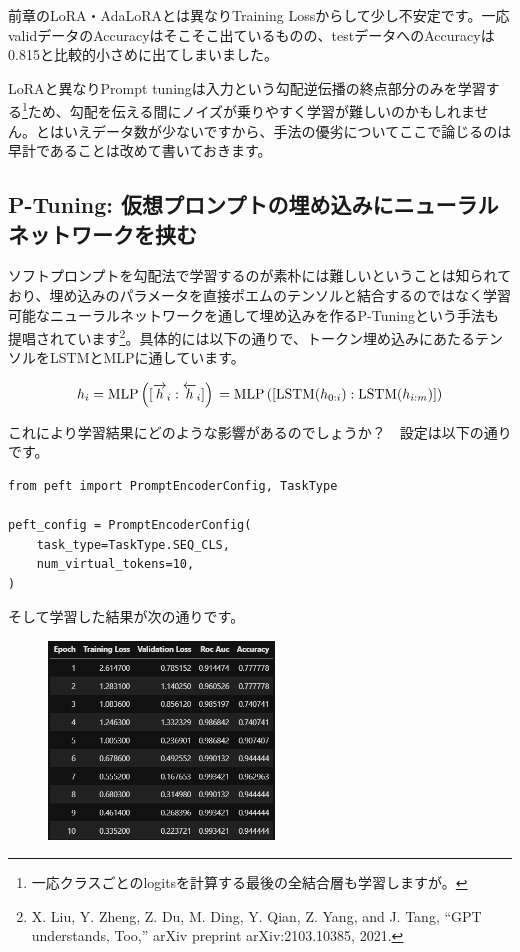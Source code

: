 \documentclass[a5paper,twoside,dvipdfmx]{jsarticle}
\begin{document}
前章のLoRA・AdaLoRAとは異なりTraining Lossからして少し不安定です。一応validデータのAccuracyはそこそこ出ているものの、testデータへのAccuracyは0.815と比較的小さめに出てしまいました。

LoRAと異なりPrompt tuningは入力という勾配逆伝播の終点部分のみを学習する\footnote{一応クラスごとのlogitsを計算する最後の全結合層も学習しますが。}ため、勾配を伝える間にノイズが乗りやすく学習が難しいのかもしれません。とはいえデータ数が少ないですから、手法の優劣についてここで論じるのは早計であることは改めて書いておきます。

\subsection{P-Tuning: 仮想プロンプトの埋め込みにニューラルネットワークを挟む}

ソフトプロンプトを勾配法で学習するのが素朴には難しいということは知られており、埋め込みのパラメータを直接ポエムのテンソルと結合するのではなく学習可能なニューラルネットワークを通して埋め込みを作る\textsf{P-Tuning}という手法も提唱されています\footnote{X. Liu, Y. Zheng, Z. Du, M. Ding, Y. Qian, Z. Yang, and J. Tang, “GPT understands, Too,” arXiv preprint arXiv:2103.10385, 2021.}。具体的には以下の通りで、トークン埋め込みにあたるテンソルをLSTMとMLPに通しています。

$$
h_i = \mathrm{MLP} \left( [\overrightarrow{h}_i : \overleftarrow{h}_i] \right) \\
= \mathrm{MLP} \left( [\mathrm{LSTM}(h_{0:i}) : \mathrm{LSTM}(h_{i:m})] \right)
$$

これにより学習結果にどのような影響があるのでしょうか？　設定は以下の通りです。

\begin{lstlisting}
from peft import PromptEncoderConfig, TaskType
  
peft_config = PromptEncoderConfig(
    task_type=TaskType.SEQ_CLS,
    num_virtual_tokens=10,
)
\end{lstlisting}

そして学習した結果が次の通りです。

\begin{figure}[h]
  \centering
  \includegraphics[width=60mm]{../C105Fig/gray/ptuning_train.png}
 \end{figure} 
\end{document}
